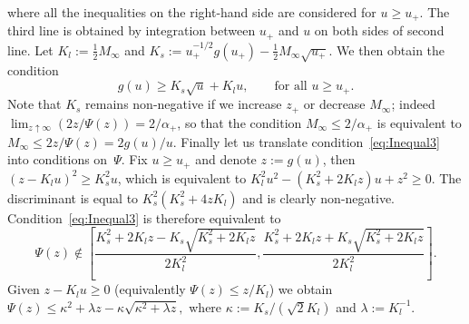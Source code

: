 \documentclass{amsart}[11pt]
\numberwithin{equation}{section}
\theoremstyle{definition}
\begin{document}
where all the inequalities on the right-hand side are considered for $u\geq u_+$.
The third line is obtained by integration between $u_+$ and $u$ on both sides of second line.
Let $K_l := \frac{1}{2}M_{\infty}$ and $K_s := u_+^{-1/2}g(u_+) - \frac{1}{2}M_{\infty}{\sqrt{u_+}} $.
We then obtain the condition
\begin{equation}\label{eq:Inequal3}
g(u) \geq K_s \sqrt{u} + K_l u, 
\qquad\text{for all }u\geq u_+.
\end{equation}
Note that $K_s$ remains non-negative if we increase $z_+$ or decrease $M_\infty$;
indeed $\lim_{z\uparrow\infty}(2 z/\Psi(z)) =2/\alpha_+$, so that the condition
$M_\infty \leq 2/\alpha_+$ is equivalent to
$M_\infty \leq 2 z/\Psi(z) = 2 g(u)/u$.
Finally let us translate condition~\eqref{eq:Inequal3} into conditions on~$\Psi$.
Fix $u\geq u_+$ and denote $z:=g(u)$, then 
$(z - K_l u)^2 \geq K_s^2 u$, 
which is equivalent to $K_l^2 u^2 - (K_s^2+2 K_l z) u + z^2 \geq 0$.
The discriminant is equal to $K_s^2(K_s^2+4 z K_l)$ and is clearly non-negative.
Condition~\eqref{eq:Inequal3} is therefore equivalent to
$$
\Psi(z) \notin \left[\frac{K_s^2+2 K_l z - K_s \sqrt{K_s^2+2 K_l z}}{2 K_l^2}, \frac{K_s^2+2 K_l z + K_s \sqrt{K_s^2+2 K_l z}}{2 K_l^2}\right].
$$
Given $z-K_l u\geq 0$ (equivalently $\Psi(z) \leq z/K_l$) we obtain
$\Psi(z) \leq \kappa^2+\lambda z - \kappa \sqrt{\kappa^2+\lambda z},$
where 
$\kappa:=K_s/\left(\sqrt{2}K_l\right)$ and $\lambda:=K_l^{-1}$.

\end{document}
